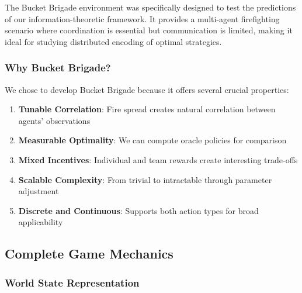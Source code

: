 \documentclass[10pt, letterpaper]{article}
\begin{document}
The Bucket Brigade environment was specifically designed to test the predictions of our information-theoretic framework. It provides a multi-agent firefighting scenario where coordination is essential but communication is limited, making it ideal for studying distributed encoding of optimal strategies.

\subsubsection{Why Bucket Brigade?}

We chose to develop Bucket Brigade because it offers several crucial properties:
\begin{enumerate}
    \item \textbf{Tunable Correlation}: Fire spread creates natural correlation between agents' observations
    \item \textbf{Measurable Optimality}: We can compute oracle policies for comparison
    \item \textbf{Mixed Incentives}: Individual and team rewards create interesting trade-offs
    \item \textbf{Scalable Complexity}: From trivial to intractable through parameter adjustment
    \item \textbf{Discrete and Continuous}: Supports both action types for broad applicability
\end{enumerate}

\subsection{Complete Game Mechanics}

\subsubsection{World State Representation}
\end{document}
